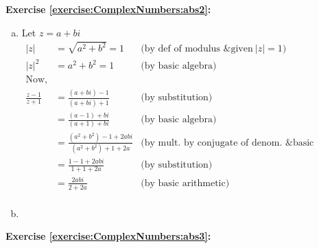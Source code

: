 \noindent\textbf{Exercise \ref{exercise:ComplexNumbers:abs2}:} %
\begin{enumerate}[(a)]
\item
Let $z=a+bi$\\
\begin{align*}
            |z|&=\sqrt{a^{2}+b^{2}}=1 & \text{(by def of modulus \& given}\ |z|=1)\\
            |z|^2&=a^{2}+b^{2}=1      & \text{(by basic algebra)}\\
            \text{Now,}\\
            \frac{z-1}{z+1}&=\frac{(a+bi)-1}{(a+bi)+1} & \text{(by substitution)}\\
            &=\frac{(a-1)+bi}{(a+1)+bi} & \text{(by basic algebra)}\\
            &=\frac{(a^{2}+b^{2})-1+2abi}{(a^{2}+b^{2})+1+2a} & \text{(by mult. by conjugate of denom. \& basic algebra)}\\
            &=\frac{1-1+2abi}{1+1+2a} & \text{(by substitution)}\\
            &=\frac{2abi}{2+2a} & \text{(by basic arithmetic)}\\
            \end{align*}

\item
\end{enumerate}

\noindent\textbf{Exercise \ref{exercise:ComplexNumbers:abs3}:}\\
%
%
%
%

